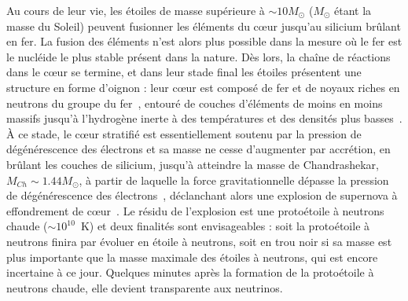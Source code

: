 Au cours de leur vie, les étoiles de masse supérieure à $\sim 10 M_\odot$ 
($M_\odot$ étant la masse du Soleil) peuvent fusionner les éléments du c\oe ur 
jusqu'au silicium brûlant en fer. 
La fusion des éléments n'est alors plus possible 
dans la mesure où le fer est le nucléide le plus stable présent dans la nature. 
Dès lors, la chaîne de réactions dans le c\oe ur se termine, et dans leur stade 
final les étoiles présentent une structure en forme d'oignon : leur c\oe ur est 
composé de fer et de noyaux riches en neutrons du groupe du 
fer~\cite{Bethe1979}, entouré de couches d'éléments de moins en moins massifs 
jusqu'à l'hydrogène inerte à des températures et des densités plus 
basses~\cite{Woosley2002}. 
À ce stade, le c\oe ur stratifié est essentiellement soutenu par la 
pression de dégénérescence des électrons et sa masse ne cesse d'augmenter par 
accrétion, en brûlant les couches de silicium, jusqu'à atteindre la masse de 
Chandrashekar, $M_{Ch} \sim 1.44M_\odot$, à partir de laquelle la force 
gravitationnelle dépasse la pression de dégénérescence des 
électrons~\cite{Chandrasekhar1931}, déclanchant alors une explosion de 
supernova à effondrement de c\oe ur~\cite{Janka2007}. 
Le résidu de l'explosion est une protoétoile à neutrons chaude 
($\sim 10^{10}$~K) et deux finalités sont envisageables : soit la protoétoile à 
neutrons finira par évoluer en étoile à neutrons, soit en trou noir si sa 
masse est plus importante que la masse maximale des étoiles à neutrons, qui est 
encore incertaine à ce jour. Quelques minutes après la formation de la
protoétoile à neutrons chaude, elle devient transparente aux neutrinos. 

